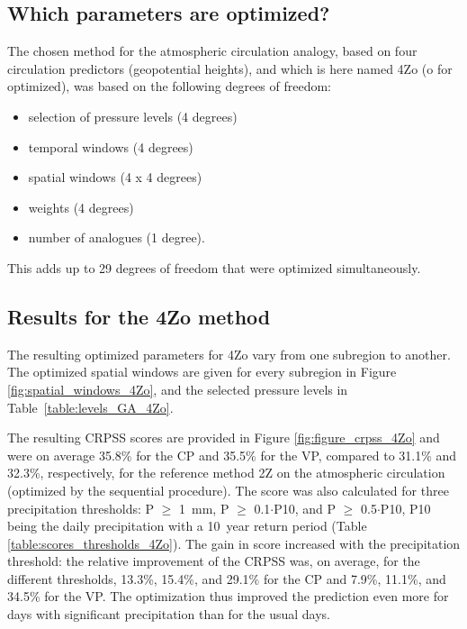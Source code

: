 \documentclass[review]{elsarticle}
\begin{document}
\subsection{Which parameters are optimized?}

The chosen method for the atmospheric circulation analogy, based on four circulation predictors (geopotential heights), and which is here named 4Zo (o for optimized), was based on the following degrees of freedom:

\begin{itemize}
	\setlength\itemsep{-4px}
	\item selection of pressure levels (4 degrees)
	\item temporal windows (4 degrees)
	\item spatial windows (4 x 4 degrees)
	\item weights (4 degrees)
	\item number of analogues (1 degree).
\end{itemize}

This adds up to 29 degrees of freedom that were optimized simultaneously.


\subsection{Results for the 4Zo method}

The resulting optimized parameters for 4Zo vary from one subregion to another. The optimized spatial windows are given for every subregion in Figure \ref{fig:spatial_windows_4Zo}, and the selected pressure levels in Table~\ref{table:levels_GA_4Zo}. 

The resulting CRPSS scores are provided in Figure \ref{fig:figure_crpss_4Zo} and were on average 35.8\% for the CP and 35.5\% for the VP, compared to 31.1\% and 32.3\%, respectively, for the reference method 2Z on the atmospheric circulation (optimized by the sequential procedure). The score was also calculated for three precipitation thresholds: P \(\geq\) 1~mm, P \(\geq\) 0.1\(\cdot\)P10, and P \(\geq\) 0.5\(\cdot\)P10, P10 being the daily precipitation with a 10~year return period (Table \ref{table:scores_thresholds_4Zo}). The gain in score increased with the precipitation threshold: the relative improvement of the CRPSS was, on average, for the different thresholds, 13.3\%, 15.4\%, and 29.1\% for the CP and 7.9\%, 11.1\%, and 34.5\% for the VP. The optimization thus improved the prediction even more for days with significant precipitation than for the usual days.
\end{document}
